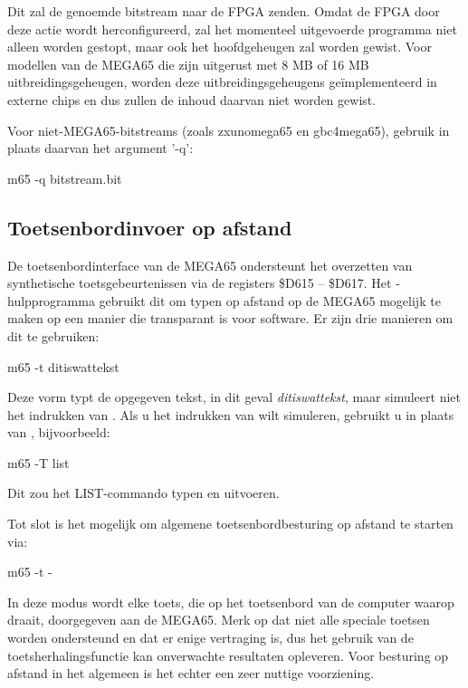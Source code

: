 Dit zal de genoemde bitstream naar de FPGA zenden. Omdat de
FPGA door deze actie wordt herconfigureerd, zal het momenteel
uitgevoerde programma niet alleen worden gestopt, maar ook het hoofdgeheugen zal worden
gewist. Voor modellen van de MEGA65 die zijn uitgerust met 8 MB of 16 MB
uitbreidingsgeheugen, worden deze uitbreidingsgeheugens geïmplementeerd in externe
chips en dus zullen de inhoud daarvan niet worden gewist.

Voor niet-MEGA65-bitstreams (zoals zxunomega65 en gbc4mega65), gebruik in plaats daarvan het argument '-q':

\begin{screencode}
m65 -q bitstream.bit
\end{screencode}

\subsection{Toetsenbordinvoer op afstand}

De toetsenbordinterface van de MEGA65 ondersteunt het overzetten van
synthetische toetsgebeurtenissen via de registers \$D615 -- \$D617.
Het -hulpprogramma gebruikt dit om typen op afstand op de MEGA65
mogelijk te maken op een manier die transparant is voor software. Er zijn drie manieren om dit
te gebruiken:

\begin{screencode}
m65 -t ditiswattekst
\end{screencode}

Deze vorm typt de opgegeven tekst, in dit geval {\em ditiswattekst}, maar
simuleert niet het indrukken van . Als u
het indrukken van  wilt simuleren, gebruikt u 
in plaats van , bijvoorbeeld:

\begin{screencode}
m65 -T list
\end{screencode}

Dit zou het LIST-commando typen en uitvoeren.

Tot slot is het mogelijk om algemene toetsenbordbesturing op afstand te starten via:

\begin{screencode}
m65 -t -
\end{screencode}

In deze modus wordt elke toets, die op het toetsenbord van de computer
waarop  draait, doorgegeven aan de MEGA65. Merk op dat
niet alle speciale toetsen worden ondersteund en dat er enige vertraging is, dus
het gebruik van de toetsherhalingsfunctie kan onverwachte resultaten opleveren. Voor besturing op afstand in het algemeen is het echter een zeer nuttige voorziening.

